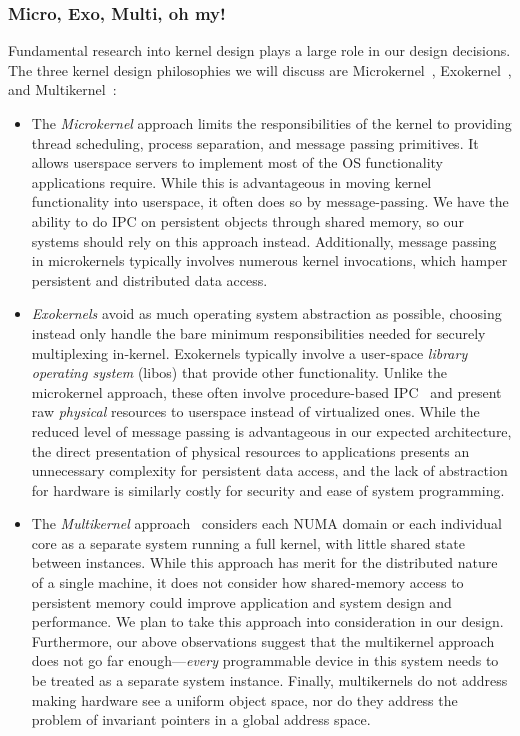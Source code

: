 \subsubsection{Micro, Exo, Multi, oh my!}

Fundamental research into kernel design plays a large role in our design decisions. The three kernel
design philosophies we will discuss are Microkernel~\cite{accetta:usenix86s},
Exokernel~\cite{engler:sosp95}, and Multikernel~\cite{baumann:sosp09}:
\begin{itemize}
    \item The \emph{Microkernel} approach limits the responsibilities of the kernel to providing
          thread scheduling, process separation, and message passing primitives. It allows userspace
          servers to implement most of the OS functionality applications require. While this is
          advantageous in moving kernel functionality into userspace, it often does so by
          message-passing. We have the ability to do IPC on persistent objects through
          shared memory, so our systems should rely on this approach instead. Additionally, message
          passing in microkernels typically involves numerous kernel invocations, which hamper
          persistent and distributed data access.

    \item \emph{Exokernels} avoid as much operating system abstraction as possible, choosing instead
          only handle the bare minimum responsibilities needed for securely multiplexing in-kernel.
          Exokernels typically involve a user-space \textit{library operating system} (libos) that
          provide other functionality. Unlike the microkernel approach, these often involve
          procedure-based IPC~\cite{lauer:osr79,engler:sosp95} and present raw \emph{physical}
          resources to userspace instead of virtualized ones. While the reduced level of message
          passing is advantageous in our expected architecture, the direct presentation of physical resources
          to applications presents an unnecessary complexity for persistent data access, and the lack
          of abstraction for hardware is similarly costly for security and ease of system programming.

    \item The \emph{Multikernel} approach~\cite{baumann:sosp09} considers each NUMA domain or each individual core as a
          separate system running a full kernel, with little shared state between instances. While
          this approach has merit for the distributed nature of a single machine, it does not consider
          how shared-memory access to persistent memory could improve application and system design
          and performance. We plan to take this approach into consideration in our design.
          Furthermore, our above observations suggest that the multikernel approach does not go far
          enough---\emph{every} programmable device in this system needs to be treated as a separate
          system instance. Finally, multikernels do not address making hardware see a uniform
          object space, nor do they address the problem of invariant pointers in a global address space.
\end{itemize}

